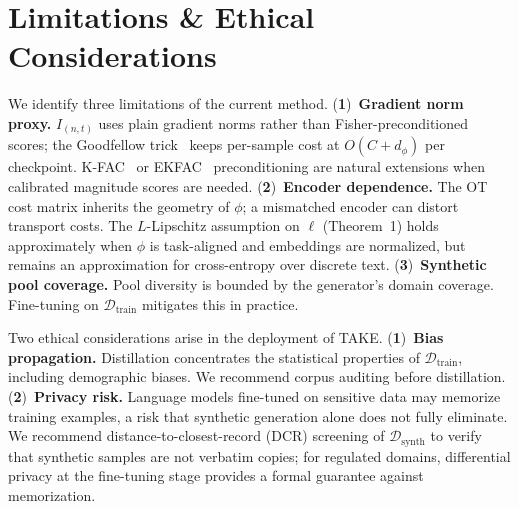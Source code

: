 \section{Limitations \& Ethical Considerations} \label{sec:06-limits}
\begin{foldable} %
  We identify three limitations of the current method.
  (\textbf{1})~\textbf{Gradient norm proxy.}
  $I_{(n,t)}$ uses plain gradient norms rather than Fisher-preconditioned scores; the Goodfellow trick~\cite{goodfellow2015efficient} keeps per-sample cost at $O(C + d_\phi)$ per checkpoint.
  K-FAC~\cite{martens2015optimizing} or EKFAC~\cite{george2018fast} preconditioning are natural extensions when calibrated magnitude scores are needed.
  (\textbf{2})~\textbf{Encoder dependence.}
  The OT cost matrix inherits the geometry of $\phi$; a mismatched encoder can distort transport costs.
  The $L$-Lipschitz assumption on $\ell$ (Theorem~1) holds approximately when $\phi$ is task-aligned and embeddings are normalized, but remains an approximation for cross-entropy over discrete text.
  (\textbf{3})~\textbf{Synthetic pool coverage.}
  Pool diversity is bounded by the generator's domain coverage.
  Fine-tuning on $\mathcal{D}_\text{train}$ mitigates this in practice.
\end{foldable}

\begin{foldable} %
  Two ethical considerations arise in the deployment of TAKE.
  (\textbf{1})~\textbf{Bias propagation.}
  Distillation concentrates the statistical properties of $\mathcal{D}_\text{train}$, including demographic biases.
  We recommend corpus auditing before distillation.
  (\textbf{2})~\textbf{Privacy risk.}
  Language models fine-tuned on sensitive data may memorize training examples, a risk that synthetic generation alone does not fully eliminate.
  We recommend distance-to-closest-record (DCR) screening of $\mathcal{D}_\text{synth}$ to verify that synthetic samples are not verbatim copies; for regulated domains, differential privacy at the fine-tuning stage provides a formal guarantee against memorization.
\end{foldable}
